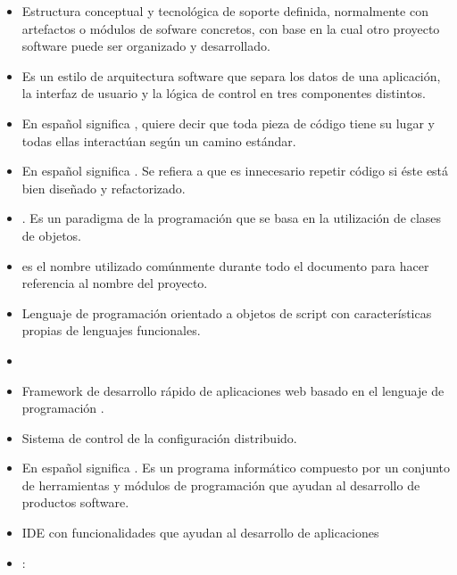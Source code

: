 \begin{itemize}
  \item {} Estructura conceptual y tecnológica de
    soporte definida, normalmente con artefactos o módulos de sofware
    concretos, con base en la cual otro proyecto software puede ser
    organizado y desarrollado.
  \item {} Es un estilo de
    arquitectura software que separa los datos de una aplicación, la
    interfaz de usuario y la lógica de control en tres componentes
    distintos.
  \item {} En español
    significa , quiere
    decir que toda pieza de código tiene su lugar y todas ellas
    interactúan según un camino estándar.
  \item {} En español significa
    . Se refiera a que es innecesario repetir
    código si éste está bien diseñado y refactorizado.
  \item {} . Es un
    paradigma de la programación que se basa en la utilización de
    clases de objetos.
  \item {} es el nombre utilizado
    comúnmente durante todo el documento para hacer referencia al
    nombre del proyecto.
  \item {} Lenguaje de programación orientado a objetos
    de script con características propias de lenguajes funcionales.
  \item {} 
  \item {} Framework de desarrollo rápido
    de aplicaciones web basado en el lenguaje de programación
    .
  \item {} Sistema de control de la configuración
    distribuido.
  \item {} En
    español significa . Es un programa informático compuesto por un
    conjunto de herramientas y módulos de programación que ayudan al
    desarrollo de productos software.
  \item {} IDE con funcionalidades que ayudan al
    desarrollo de aplicaciones 
  \item {}:

\end{itemize}
